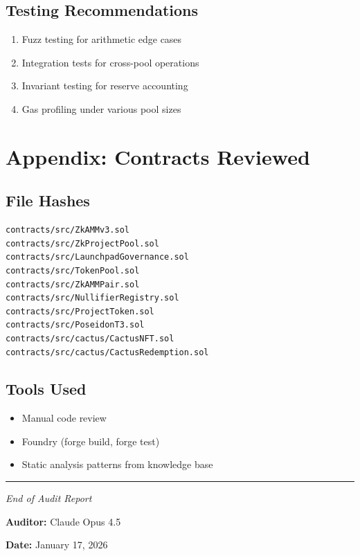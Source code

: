 \documentclass[11pt,a4paper]{article}
\begin{document}
\subsection{Testing Recommendations}

\begin{enumerate}
    \item Fuzz testing for arithmetic edge cases
    \item Integration tests for cross-pool operations
    \item Invariant testing for reserve accounting
    \item Gas profiling under various pool sizes
\end{enumerate}

\newpage

\section{Appendix: Contracts Reviewed}

\subsection{File Hashes}

\begin{verbatim}
contracts/src/ZkAMMv3.sol
contracts/src/ZkProjectPool.sol
contracts/src/LaunchpadGovernance.sol
contracts/src/TokenPool.sol
contracts/src/ZkAMMPair.sol
contracts/src/NullifierRegistry.sol
contracts/src/ProjectToken.sol
contracts/src/PoseidonT3.sol
contracts/src/cactus/CactusNFT.sol
contracts/src/cactus/CactusRedemption.sol
\end{verbatim}

\subsection{Tools Used}

\begin{itemize}
    \item Manual code review
    \item Foundry (forge build, forge test)
    \item Static analysis patterns from knowledge base
\end{itemize}

\vspace{2cm}

\begin{center}
\rule{0.5\textwidth}{0.4pt}

\textit{End of Audit Report}

\textbf{Auditor:} Claude Opus 4.5

\textbf{Date:} January 17, 2026
\end{center}
\end{document}
